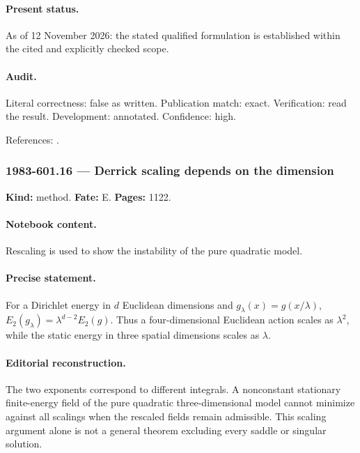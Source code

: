 \paragraph{Present status.} As of 12 November 2026: the stated qualified formulation is established within the cited and explicitly checked scope.

\paragraph{Audit.} Literal correctness: false as written. Publication match: exact. Verification: read the result. Development: annotated. Confidence: high.

\noindent References: \citep{witten1983current,hatcher2002algebraic}.\par

\subsubsection{1983-601.16 --- Derrick scaling depends on the dimension}

\label{item:1983-601.16}

\noindent\textbf{Kind:} method. \textbf{Fate:} E. \textbf{Pages:} 1122.\par

\paragraph{Notebook content.} Rescaling is used to show the instability of the pure quadratic model.

\paragraph{Precise statement.} For a Dirichlet energy in \(d\) Euclidean dimensions and \(g_\lambda(x)=g(x/\lambda)\), \(E_2(g_\lambda)=\lambda^{d-2}E_2(g)\). Thus a four-dimensional Euclidean action scales as \(\lambda^2\), while the static energy in three spatial dimensions scales as \(\lambda\).

\paragraph{Editorial reconstruction.} The two exponents correspond to different integrals. A nonconstant stationary finite-energy field of the pure quadratic three-dimensional model cannot minimize against all scalings when the rescaled fields remain admissible. This scaling argument alone is not a general theorem excluding every saddle or singular solution.

